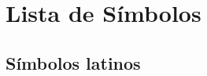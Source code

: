 
\providecommand{\simbololabel}[1]{#1\hfill}

\newenvironment{listasimbolos}[1]
  {\begin{list}{}{%
      \settowidth{\labelwidth}{#1}%
      \setlength{\leftmargin}{\labelwidth}%
      \addtolength{\leftmargin}{\labelsep}%
      \setlength{\topsep}{0.5\baselineskip}%
      \setlength{\itemsep}{0.25\baselineskip}%
      \setlength{\parsep}{0pt}%
      \let\makelabel\simbololabel}}
  {\end{list}}

\chapter*{Lista de Símbolos}
{}

\section*{Símbolos latinos}

